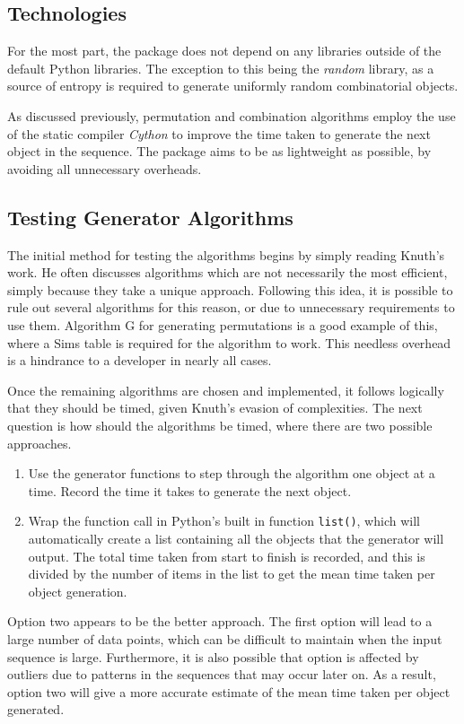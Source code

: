 \documentclass[12pt]{article}
\begin{document}
\subsection{Technologies}
For the most part, the package does not depend on any libraries outside of the default Python libraries. The exception to this being the \textit{random} library, as a source of entropy is required to generate uniformly random combinatorial objects.

As discussed previously, permutation and combination algorithms employ the use of the static compiler \textit{Cython} to improve the time taken to generate the next object in the sequence. The package aims to be as lightweight as possible, by avoiding all unnecessary overheads.

\subsection{Testing Generator Algorithms}
The initial method for testing the algorithms begins by simply reading Knuth's work. He often discusses algorithms which are not necessarily the most efficient, simply because they take a unique approach. Following this idea, it is possible to rule out several algorithms for this reason, or due to unnecessary requirements to use them. Algorithm G for generating permutations \cite{perm_G} is a good example of this, where a Sims table is required for the algorithm to work. This needless overhead is a hindrance to a developer in nearly all cases.

Once the remaining algorithms are chosen and implemented, it follows logically that they should be timed, given Knuth's evasion of complexities. The next question is how should the algorithms be timed, where there are two possible approaches.

\begin{enumerate}
  \item Use the generator functions to step through the algorithm one object at a time. Record the time it takes to generate the next object.
  \item Wrap the function call in Python's built in function \lstinline{list()}, which will automatically create a list containing all the objects that the generator will output. The total time taken from start to finish is recorded, and this is divided by the number of items in the list to get the mean time taken per object generation.
\end{enumerate}

Option two appears to be the better approach. The first option will lead to a large number of data points, which can be difficult to maintain when the input sequence is large. Furthermore, it is also possible that option is affected by outliers due to patterns in the sequences that may occur later on. As a result, option two will give a more accurate estimate of the mean time taken per object generated.
\end{document}
